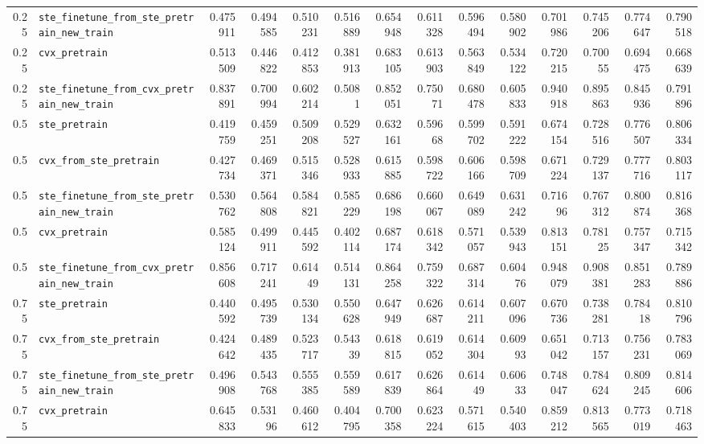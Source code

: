 \begin{longtable}{@{}r l *{12}{r}@{}}
0.25 & \texttt{ste\_finetune\_from\_ste\_pretrain\_new\_train} & 0.475911 & 0.494585 & 0.510231 & 0.516889 & 0.654948 & 0.611328 & 0.596494 & 0.580902 & 0.701986 & 0.745206 & 0.774647 & 0.790518 \\
0.25 & \texttt{cvx\_pretrain} & 0.513509 & 0.446822 & 0.412853 & 0.381913 & 0.683105 & 0.613903 & 0.563849 & 0.534122 & 0.720215 & 0.70055 & 0.694475 & 0.668639 \\
0.25 & \texttt{ste\_finetune\_from\_cvx\_pretrain\_new\_train} & 0.837891 & 0.700994 & 0.602214 & 0.5081 & 0.852051 & 0.75071 & 0.680478 & 0.605833 & 0.940918 & 0.895863 & 0.845936 & 0.791896 \\
0.5 & \texttt{ste\_pretrain} & 0.419759 & 0.459251 & 0.509208 & 0.529527 & 0.632161 & 0.59668 & 0.599702 & 0.591222 & 0.674154 & 0.728516 & 0.776507 & 0.806334 \\
0.5 & \texttt{cvx\_from\_ste\_pretrain} & 0.427734 & 0.469371 & 0.515346 & 0.528933 & 0.615885 & 0.598722 & 0.606166 & 0.598709 & 0.671224 & 0.729137 & 0.777716 & 0.803117 \\
0.5 & \texttt{ste\_finetune\_from\_ste\_pretrain\_new\_train} & 0.530762 & 0.564808 & 0.584821 & 0.585229 & 0.686198 & 0.660067 & 0.649089 & 0.631242 & 0.71696 & 0.767312 & 0.800874 & 0.816368 \\
0.5 & \texttt{cvx\_pretrain} & 0.585124 & 0.499911 & 0.445592 & 0.402114 & 0.687174 & 0.618342 & 0.571057 & 0.539943 & 0.813151 & 0.78125 & 0.757347 & 0.715342 \\
0.5 & \texttt{ste\_finetune\_from\_cvx\_pretrain\_new\_train} & 0.856608 & 0.717241 & 0.61449 & 0.514131 & 0.864258 & 0.759322 & 0.687314 & 0.60476 & 0.948079 & 0.908381 & 0.851283 & 0.789886 \\
0.75 & \texttt{ste\_pretrain} & 0.440592 & 0.495739 & 0.530134 & 0.550628 & 0.647949 & 0.626687 & 0.614211 & 0.607096 & 0.670736 & 0.738281 & 0.78418 & 0.810796 \\
0.75 & \texttt{cvx\_from\_ste\_pretrain} & 0.424642 & 0.489435 & 0.523717 & 0.54339 & 0.618815 & 0.619052 & 0.614304 & 0.60993 & 0.651042 & 0.713157 & 0.756231 & 0.783069 \\
0.75 & \texttt{ste\_finetune\_from\_ste\_pretrain\_new\_train} & 0.496908 & 0.543768 & 0.555385 & 0.559589 & 0.617839 & 0.626864 & 0.61449 & 0.60633 & 0.748047 & 0.784624 & 0.809245 & 0.814606 \\
0.75 & \texttt{cvx\_pretrain} & 0.645833 & 0.53196 & 0.460612 & 0.404795 & 0.700358 & 0.623224 & 0.571615 & 0.540403 & 0.859212 & 0.813565 & 0.773019 & 0.718463 \\

\end{longtable}
